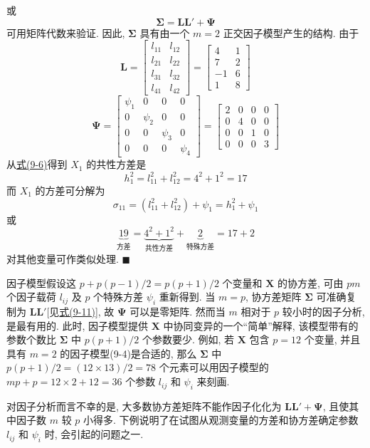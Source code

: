 
或
\[
\boldsymbol{\Sigma}=\mathbf{L}\mathbf{L}'+\boldsymbol{\Psi}
\]
可用矩阵代数来验证. 因此, $\boldsymbol{\Sigma}$ 具有由一个 $m=2$ 正交因子模型产生的结构. 由于
\[
\mathbf{L}=\begin{bmatrix}
l_{11}&l_{12}\\
l_{21}&l_{22}\\
l_{31}&l_{32}\\
l_{41}&l_{42}
\end{bmatrix}=\begin{bmatrix}4&1\\7&2\\-1&6\\1&8\end{bmatrix}
\]
\[
\boldsymbol{\Psi}=\begin{bmatrix}
\psi_1&0&0&0\\
0&\psi_2&0&0\\
0&0&\psi_3&0\\
0&0&0&\psi_4
\end{bmatrix}=\begin{bmatrix}
2&0&0&0\\
0&4&0&0\\
0&0&1&0\\
0&0&0&3
\end{bmatrix}
\]
从\hyperref[eq:9-6]{式(9-6)}得到 $X_1$ 的共性方差是
\[
h_1^2=l_{11}^2+l_{12}^2=4^2+1^2=17
\]
而 $X_1$ 的方差可分解为
\[
\sigma_{11}=(l_{11}^2+l_{12}^2)+\psi_1=h_1^2+\psi_1
\]
或
\[
\underbrace{19}_{\text{方差}}=\underbrace{4^2+1^2}_{\text{共性方差}}+\underbrace{2}_{\text{特殊方差}}=17+2
\]
对其他变量可作类似处理. \hfill$\blacksquare$

因子模型假设这 $p+p(p-1)/2=p(p+1)/2$ 个变量和 $\mathbf{X}$ 的协方差, 可由 $pm$ 个因子载荷 $l_{ij}$ 及 $p$ 个特殊方差 $\psi_i$ 重新得到. 当 $m=p$, 协方差矩阵 $\boldsymbol{\Sigma}$ 可准确复制为 $\mathbf{L}\mathbf{L}'$[见\hyperref[eq:9-11]{式(9-11)}], 故 $\boldsymbol{\Psi}$ 可以是零矩阵. 然而当 $m$ 相对于 $p$ 较小时的因子分析, 是最有用的. 此时, 因子模型提供 $\mathbf{X}$ 中协同变异的一个“简单”解释, 该模型带有的参数个数比 $\boldsymbol{\Sigma}$ 中 $p(p+1)/2$ 个参数要少. 例如, 若 $\mathbf{X}$ 包含 $p=12$ 个变量, 并且具有 $m=2$ 的因子模型(9-4)是合适的, 那么 $\boldsymbol{\Sigma}$ 中 $p(p+1)/2=(12\times13)/2=78$ 个元素可以用因子模型的 $mp+p=12\times2+12=36$ 个参数 $l_{ij}$ 和 $\psi_i$ 来刻画.

对因子分析而言不幸的是, 大多数协方差矩阵不能作因子化化为 $\mathbf{L}\mathbf{L}'+\boldsymbol{\Psi}$, 且使其中因子数 $m$ 较 $p$ 小得多. 下例说明了在试图从观测变量的方差和协方差确定参数 $l_{ij}$ 和 $\psi_i$ 时, 会引起的问题之一.

